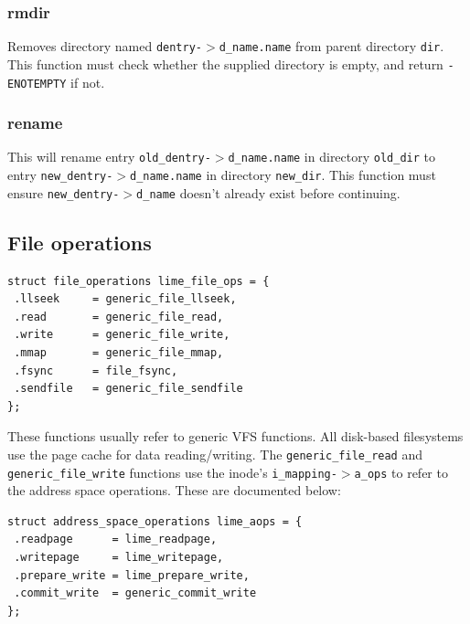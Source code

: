 \subsubsection{rmdir}


Removes directory named \texttt{dentry-$>$d\_name.name} from parent directory \texttt{dir}. This function must check whether the supplied directory is empty, and return \texttt{-ENOTEMPTY} if not.

\subsubsection{rename}


This will rename entry \texttt{old\_dentry-$>$d\_name.name} in directory \texttt{old\_dir} to entry \texttt{new\_dentry-$>$d\_name.name} in directory \texttt{new\_dir}. This function must ensure \texttt{new\_dentry-$>$d\_name} doesn't already exist before continuing.

\subsection{File operations}
\label{fileops}

\begin{verbatim}
struct file_operations lime_file_ops = {
 .llseek     = generic_file_llseek,
 .read       = generic_file_read,
 .write      = generic_file_write,
 .mmap       = generic_file_mmap,
 .fsync      = file_fsync,
 .sendfile   = generic_file_sendfile
};
\end{verbatim}

These functions usually refer to generic VFS functions. All disk-based filesystems use the page cache for data reading/writing. The \texttt{generic\_file\_read} and \texttt{generic\_file\_write} functions use the inode's \texttt{i\_mapping-$>$a\_ops} to refer to the address space operations. These are documented below:

\begin{verbatim}
struct address_space_operations lime_aops = {
 .readpage      = lime_readpage,
 .writepage     = lime_writepage,
 .prepare_write = lime_prepare_write,
 .commit_write  = generic_commit_write
};
\end{verbatim}

